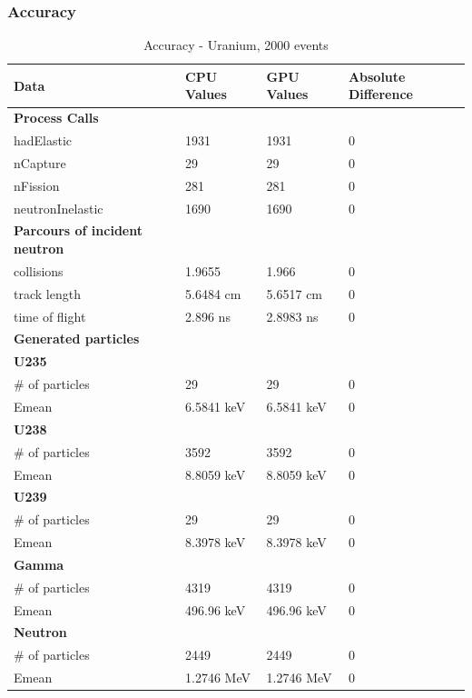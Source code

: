 \documentclass[12pt]{article}
\begin{document}
	\subsubsection{Accuracy}
		\begin{table}[H]
		\centering
		\caption{Accuracy - Uranium, 2000 events}\label{sys2Acc}
		\begin{tabular}{lp{2.3cm}p{2.3cm}l}
		\toprule
		\bf Data & CPU Values & GPU Values & Absolute Difference\\\midrule
		\bf Process Calls&&&\\
		hadElastic&1931&1931&0\\
		nCapture&29&29&0\\
		nFission&281&281&0\\		
		neutronInelastic&1690&1690&0\\ 

		\midrule	
		\bf Parcours of incident neutron&&&\\
		collisions&1.9655&1.966&0\\
		track length&5.6484 cm&5.6517 cm&0\\
		time of flight&2.896 ns&2.8983 ns&0\\
		
		\midrule
		\bf Generated particles&&&\\
		\bf{U235}&&&\\
		\# of particles&29&29&0\\
		Emean&6.5841 keV&6.5841 keV&0\\
		
		\bf{U238}&&&\\
		\# of particles&3592&3592&0\\
		Emean&8.8059 keV&8.8059 keV&0\\
		
		\bf{U239}&&&\\
		\# of particles&29&29&0\\
		Emean&8.3978 keV&8.3978 keV&0\\
		
		\bf{Gamma}&&&\\
		\# of particles&4319&4319&0\\
		Emean&496.96 keV&496.96 keV&0\\
		
		\bf{Neutron}&&&\\
		\# of particles&2449&2449&0\\
		Emean&1.2746 MeV&1.2746 MeV&0\\\bottomrule
		
		\end{tabular}
		\end{table}
		\break
\end{document}
